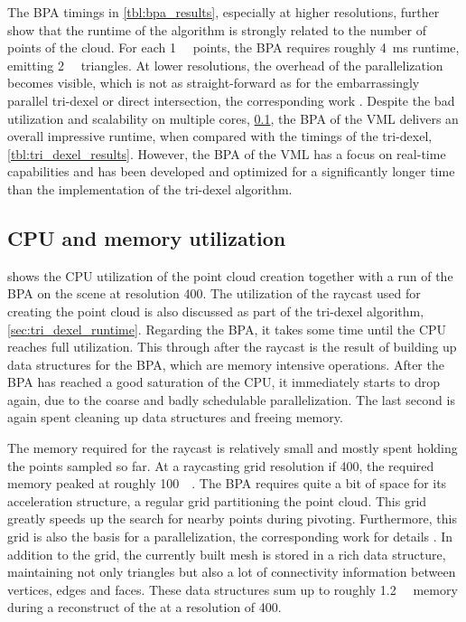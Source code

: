 The BPA timings in \cref{tbl:bpa_results}, especially at higher resolutions, further show that the runtime of the algorithm is strongly related to the number of points of the cloud.
For each \SI{1}{\kilo\nothing} points, the BPA requires roughly \SI{4}{\milli\second} runtime, emitting \SI{2}{\kilo\nothing} triangles.
At lower resolutions, the overhead of the parallelization becomes visible, which is not as straight-forward as for the embarrassingly parallel tri-dexel or direct intersection, \cf the corresponding work \cite{bpa_vml}.
Despite the bad utilization and scalability on multiple cores, \cf \cref{sec:bpa_utilization}, the BPA of the VML delivers an overall impressive runtime, when compared with the timings of \eg the tri-dexel, \cf \cref{tbl:tri_dexel_results}.
However, the BPA of the VML has a focus on real-time capabilities and has been developed and optimized for a significantly longer time than the implementation of the tri-dexel algorithm.


\subsection{CPU and memory utilization}
\label{sec:bpa_utilization}

 shows the CPU utilization of the point cloud creation together with a run of the BPA on the \impeller scene at resolution 400.
The utilization of the raycast used for creating the point cloud is also discussed as part of the tri-dexel algorithm, \cf \cref{sec:tri_dexel_runtime}.
Regarding the BPA, it takes some time until the CPU reaches full utilization.
This through after the raycast is the result of building up data structures for the BPA, which are memory intensive operations.
After the BPA has reached a good saturation of the CPU, it immediately starts to drop again, due to the coarse and badly schedulable parallelization.
The last second is again spent cleaning up data structures and freeing memory.

The memory required for the raycast is relatively small and mostly spent holding the points sampled so far.
At a raycasting grid resolution if 400, the required memory peaked at roughly \SI{100}{\mebi\byte}.
The BPA requires quite a bit of space for its acceleration structure, a regular grid partitioning the point cloud.
This grid greatly speeds up the search for nearby points during pivoting.
Furthermore, this grid is also the basis for a parallelization, \cf the corresponding work for details \cite{bpa_vml}.
In addition to the grid, the currently built mesh is stored in a rich data structure, maintaining not only triangles but also a lot of connectivity information between vertices, edges and faces.
These data structures sum up to roughly \SI{1.2}{\gibi\byte} memory during a reconstruct of the \impeller at a resolution of 400.


